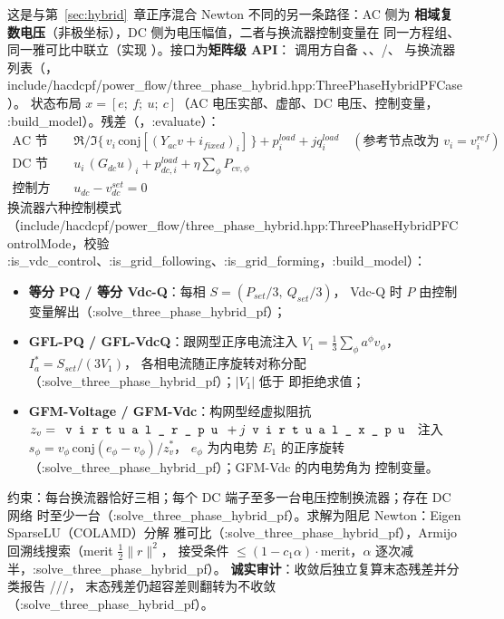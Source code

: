 这是与第~\ref{sec:hybrid}~章正序混合 Newton 不同的另一条路径：AC 侧为
\textbf{相域复数电压}（非极坐标），DC 侧为电压幅值，二者与换流器控制变量在
同一方程组、同一雅可比中联立（实现
）。接口为\textbf{矩阵级 API}：
调用方自备 、、/、
 与换流器列表（，include/hacdcpf/power\_flow/three\_phase\_hybrid.hpp:ThreePhaseHybridPFCase）。
状态布局 $x=[e;\ f;\ u;\ c]$（AC 电压实部、虚部、DC 电压、控制变量，
:build\_model）。残差（，:evaluate）：
\begin{align*}
\text{AC 节点：}\quad & \Re/\Im\{\,v_i\,\mathrm{conj}[(Y_{ac}v+i_{fixed})_i]\,\}
  +p_i^{load}+jq_i^{load}\quad(\text{参考节点改为 }v_i=v_i^{ref})\\
\text{DC 节点：}\quad & u_i\,(G_{dc}u)_i+p_{dc,i}^{load}+\eta\sum_{\phi}P_{cv,\phi}\\
\text{控制方程：}\quad & u_{dc}-v_{dc}^{set}=0
\end{align*}
换流器六种控制模式（include/hacdcpf/power\_flow/three\_phase\_hybrid.hpp:ThreePhaseHybridPFControlMode，校验 :is\_vdc\_control、:is\_grid\_following、:is\_grid\_forming，:build\_model）：
\begin{itemize}
  \item \textbf{等分 PQ / 等分 Vdc-Q}：每相 $S=(P_{set}/3,\ Q_{set}/3)$，
        Vdc-Q 时 $P$ 由控制变量解出（:solve\_three\_phase\_hybrid\_pf）；
  \item \textbf{GFL-PQ / GFL-VdcQ}：跟网型正序电流注入
        $V_1=\frac13\sum_\phi a^{\phi}v_\phi$，$I_a^{*}=S_{set}/(3V_1)$，
        各相电流随正序旋转对称分配（:solve\_three\_phase\_hybrid\_pf）；$|V_1|$ 低于
         即拒绝求值；
  \item \textbf{GFM-Voltage / GFM-Vdc}：构网型经虚拟阻抗
        $z_v=\fld{virtual\_r\_pu}+j\fld{virtual\_x\_pu}$ 注入
        $s_\phi=v_\phi\,\mathrm{conj}(e_\phi-v_\phi)/z_v^{*}$，
        $e_\phi$ 为内电势 $E_1$ 的正序旋转（:solve\_three\_phase\_hybrid\_pf）；GFM-Vdc 的内电势角为
        控制变量。
\end{itemize}
约束：每台换流器恰好三相；每个 DC 端子至多一台电压控制换流器；存在 DC 网络
时至少一台（:solve\_three\_phase\_hybrid\_pf）。求解为阻尼 Newton：Eigen SparseLU（COLAMD）分解
雅可比（:solve\_three\_phase\_hybrid\_pf），Armijo 回溯线搜索（merit $\tfrac12\lVert r\rVert^2$，
接受条件 $\le(1-c_1\alpha)\cdot$merit，$\alpha$ 逐次减半，:solve\_three\_phase\_hybrid\_pf）。
\textbf{诚实审计}：收敛后独立复算末态残差并分类报告
///，
末态残差仍超容差则翻转为不收敛（:solve\_three\_phase\_hybrid\_pf）。

